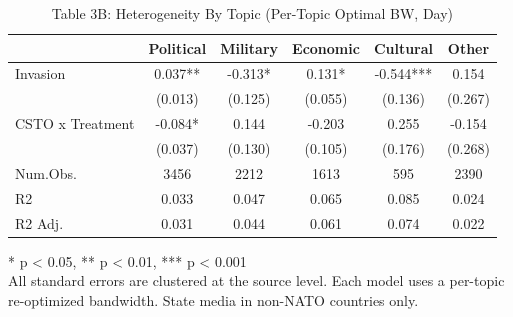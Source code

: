 \begin{table}[!t]
\caption{Table 3B: Heterogeneity By Topic (Per-Topic Optimal BW, Day)} 
\fontsize{12.0pt}{14.4pt}\selectfont
\begin{tabular*}{\linewidth}{@{\extracolsep{\fill}}lccccc}
\toprule
  & Political & Military & Economic & Cultural & Other \\ 
\midrule\addlinespace[2.5pt]
Invasion & 0.037** & -0.313* & 0.131* & -0.544*** & 0.154 \\ 
 & (0.013) & (0.125) & (0.055) & (0.136) & (0.267) \\ 
CSTO x Treatment & -0.084* & 0.144 & -0.203 & 0.255 & -0.154 \\ 
{} & {(0.037)} & {(0.130)} & {(0.105)} & {(0.176)} & {(0.268)} \\ 
Num.Obs. & 3456 & 2212 & 1613 & 595 & 2390 \\ 
R2 & 0.033 & 0.047 & 0.065 & 0.085 & 0.024 \\ 
R2 Adj. & 0.031 & 0.044 & 0.061 & 0.074 & 0.022 \\ 
\bottomrule
\end{tabular*}
\begin{minipage}{\linewidth}
* p < 0.05, ** p < 0.01, *** p < 0.001\\
All standard errors are clustered at the source level. Each model uses a
per-topic re-optimized bandwidth. State media in non-NATO countries only.\\
\end{minipage}
\end{table}

